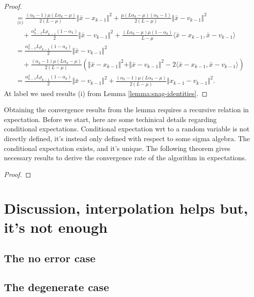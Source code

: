 \documentclass[12pt]{article}
\begin{document}
\begin{proof}
{\begin{align*}
                &\underset{\text{(c)}}{=}
                \frac{(\alpha_k - 1)\mu(L\alpha_k - \mu)}{2(L - \mu)}\Vert \bar x - x_{k - 1}\Vert^2
                + 
                \frac{\mu(L\alpha_k - \mu)(\alpha_k - 1)}{2(L - \mu)}\Vert \bar x - v_{k - 1}\Vert^2
                \\ &\quad 
                    + \frac{\alpha_{k - 1}^2L \rho_{k - 1}(1 - \alpha_k)}{2}\Vert \bar x - v_{k - 1}\Vert^2
                    + \frac{(L\alpha_k - \mu)\mu(1 - \alpha_k)}{L - \mu}\langle \bar x - x_{k - 1}, \bar x - v_{k - 1}\rangle
                \\
                &= 
                \frac{\alpha_{k - 1}^2L \rho_{k - 1}(1 - \alpha_k)}{2}\Vert \bar x - v_{k - 1}\Vert^2
                \\ & \quad
                    + \frac{(\alpha_k - 1)\mu(L\alpha_k - \mu)}{2(L - \mu)}\left(
                        \Vert \bar x - x_{k - 1}\Vert^2 + \Vert \bar x - v_{k - 1}\Vert^2 - 2\langle\bar x - x_{k - 1},\bar x - v_{k - 1} \rangle
                    \right)
                \\
                &= \frac{\alpha_{k - 1}^2L \rho_{k - 1}(1 - \alpha_k)}{2}\Vert \bar x - v_{k - 1}\Vert^2
                + \frac{(\alpha_k - 1)\mu(L\alpha_k - \mu)}{2(L - \mu)}\Vert x_{k - 1} - v_{k - 1}\Vert^2. 
            \end{align*}
            }
            At label  we used results (i) from Lemma \ref{lemma:snag-identities}. 
        \end{proof}
        Obtaining the convergence results from the lemma requires a recursive relation in expectation. 
        Before we start, here are some techinical details regarding conditional expectations. 
        Conditional expectation wrt to a random variable is not directly defined, it's instead only defined with respect to some sigma algebra. 
        The conditional expectation exists, and it's unique. 
        The following theorem gives necessary results to derive the convergence rate of the algorithm in expectations. 
        \begin{theorem}\label{thm:snag-descent-expe}
            
        \end{theorem}
        \begin{proof}
            
        \end{proof}
\section{Discussion, interpolation helps but, it's not enough}
    \subsection{The no error case}
    \subsection{The degenerate case}




\end{document}
